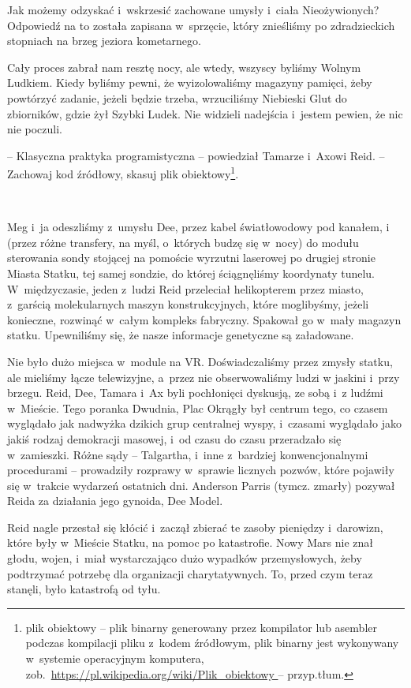 \documentclass[oneside,polish,11pt,sfheadings]{mwbk}
\begin{document}
Jak możemy odzyskać i~wskrzesić zachowane umysły i~ciała Nieożywionych? Odpowiedź na to została zapisana w~sprzęcie, który znieśliśmy po
zdradzieckich stopniach na brzeg jeziora kometarnego.

Cały proces zabrał nam resztę nocy, ale wtedy, wszyscy byliśmy Wolnym
Ludkiem. Kiedy byliśmy pewni, że wyizolowaliśmy magazyny pamięci, żeby
powtórzyć zadanie, jeżeli będzie trzeba, wrzuciliśmy Niebieski Glut do
zbiorników, gdzie żył Szybki Ludek. Nie widzieli nadejścia i~jestem
pewien, że nic nie poczuli.

-- Klasyczna praktyka programistyczna -- powiedział Tamarze i~Axowi Reid.
-- Zachowaj kod źródłowy, skasuj plik obiektowy\footnote{plik obiektowy -- plik binarny generowany przez kompilator lub asembler podczas kompilacji
pliku z~kodem źródłowym, plik binarny jest wykonywany w~systemie
operacyjnym komputera, zob.~\url{https://pl.wikipedia.org/wiki/Plik_obiektowy } -- przyp.tłum.}.

~

Meg i~ja odeszliśmy z~umysłu Dee, przez kabel światłowodowy pod kanałem,
i (przez różne transfery, na myśl, o~których budzę się w~nocy) do modułu
sterowania sondy stojącej na pomoście wyrzutni laserowej po drugiej
stronie Miasta Statku, tej samej sondzie, do której ściągnęliśmy
koordynaty tunelu. W~międzyczasie, jeden z~ludzi Reid przeleciał
helikopterem przez miasto, z~garścią molekularnych maszyn
konstrukcyjnych, które moglibyśmy, jeżeli konieczne, rozwinąć w~całym
kompleks fabryczny. Spakował go w~mały magazyn statku. Upewniliśmy się,
że nasze informacje genetyczne są załadowane.

Nie było dużo miejsca w~module na VR. Doświadczaliśmy przez zmysły
statku, ale mieliśmy łącze telewizyjne, a~przez nie obserwowaliśmy ludzi
w jaskini i~przy brzegu. Reid, Dee, Tamara i~Ax byli pochłonięci
dyskusją, ze sobą i~z ludźmi w~Mieście. Tego poranka Dwudnia, Plac
Okrągły był centrum tego, co czasem wyglądało jak nadwyżka dzikich grup
centralnej wyspy, i~czasami wyglądało jako jakiś rodzaj demokracji
masowej, i~od czasu do czasu przeradzało się w~zamieszki. Różne sądy -- Talgartha, i~inne z~bardziej konwencjonalnymi procedurami -- prowadziły
rozprawy w~sprawie licznych pozwów, które pojawiły się w~trakcie
wydarzeń ostatnich dni. Anderson Parris (tymcz. zmarły) pozywał Reida za
działania jego gynoida, Dee Model.

Reid nagle przestał się kłócić i~zaczął zbierać te zasoby pieniędzy i~darowizn, które były w~Mieście Statku, na pomoc po katastrofie. Nowy
Mars nie znał głodu, wojen, i~miał wystarczająco dużo wypadków
przemysłowych, żeby podtrzymać potrzebę dla organizacji charytatywnych.
To, przed czym teraz stanęli, było katastrofą od tyłu.
\end{document}
